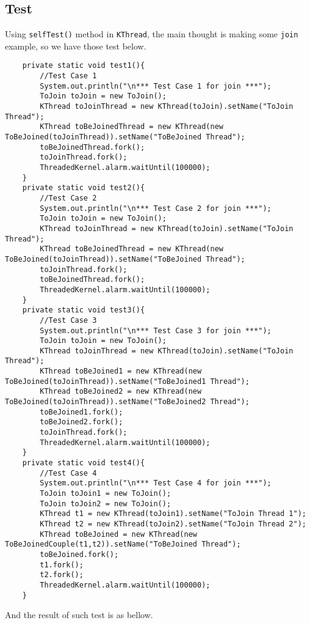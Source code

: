 \documentclass{article}
\begin{document}
\subsection{Test}
Using \texttt{selfTest()} method in \texttt{KThread}, the main thought is making some \texttt{join} example, so we have those test below.
\begin{lstlisting}
	private static void test1(){
		//Test Case 1
		System.out.println("\n*** Test Case 1 for join ***");
		ToJoin toJoin = new ToJoin();
		KThread toJoinThread = new KThread(toJoin).setName("ToJoin Thread");
		KThread toBeJoinedThread = new KThread(new ToBeJoined(toJoinThread)).setName("ToBeJoined Thread");
		toBeJoinedThread.fork();
		toJoinThread.fork();
		ThreadedKernel.alarm.waitUntil(100000);
	}
	private static void test2(){
		//Test Case 2
		System.out.println("\n*** Test Case 2 for join ***");
		ToJoin toJoin = new ToJoin();
		KThread toJoinThread = new KThread(toJoin).setName("ToJoin Thread");
		KThread toBeJoinedThread = new KThread(new ToBeJoined(toJoinThread)).setName("ToBeJoined Thread");
		toJoinThread.fork();
		toBeJoinedThread.fork();
		ThreadedKernel.alarm.waitUntil(100000);
	}
	private static void test3(){
		//Test Case 3
		System.out.println("\n*** Test Case 3 for join ***");
		ToJoin toJoin = new ToJoin();
		KThread toJoinThread = new KThread(toJoin).setName("ToJoin Thread");
		KThread toBeJoined1 = new KThread(new ToBeJoined(toJoinThread)).setName("ToBeJoined1 Thread");
		KThread toBeJoined2 = new KThread(new ToBeJoined(toJoinThread)).setName("ToBeJoined2 Thread");
		toBeJoined1.fork();
		toBeJoined2.fork();
		toJoinThread.fork();
		ThreadedKernel.alarm.waitUntil(100000);
	}
	private static void test4(){
		//Test Case 4
		System.out.println("\n*** Test Case 4 for join ***");
		ToJoin toJoin1 = new ToJoin();
		ToJoin toJoin2 = new ToJoin();
		KThread t1 = new KThread(toJoin1).setName("ToJoin Thread 1");
		KThread t2 = new KThread(toJoin2).setName("ToJoin Thread 2");
		KThread toBeJoined = new KThread(new ToBeJoinedCouple(t1,t2)).setName("ToBeJoined Thread");
		toBeJoined.fork();
		t1.fork();
		t2.fork();
		ThreadedKernel.alarm.waitUntil(100000);
	}
\end{lstlisting}
And the result of such test is as bellow.
\end{document}
